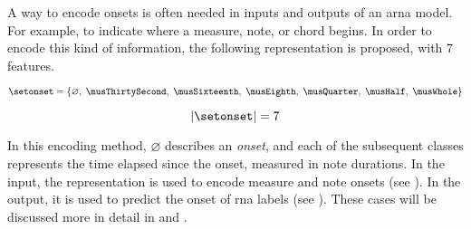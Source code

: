 
A way to encode onsets is often needed in inputs and outputs
of an \gls{arna} model. For example, to indicate where a
measure, note, or chord begins. 
In order to encode this kind of information, the following
representation is proposed, with 7 features.

\begin{equation}
    \label{eq:onset_7}
    \setonset = \{\varnothing,\; \musThirtySecond,\; \musSixteenth,\; 
    \musEighth,\; \musQuarter,\; \musHalf,\; \musWhole \}
\end{equation}

\begin{equation}
    \label{eq:onset_7_magnitude}
    | \setonset | = 7
\end{equation}

In this encoding method, $\varnothing$ describes an
\emph{onset}, and each of the subsequent classes represents
the time elapsed since the onset, measured in note
durations. In the input, the representation is used to
encode measure and note onsets (see
). In the output, it is
used to predict the onset of \gls{rna} labels (see
). These cases will be
discussed more in detail in
 and
.
